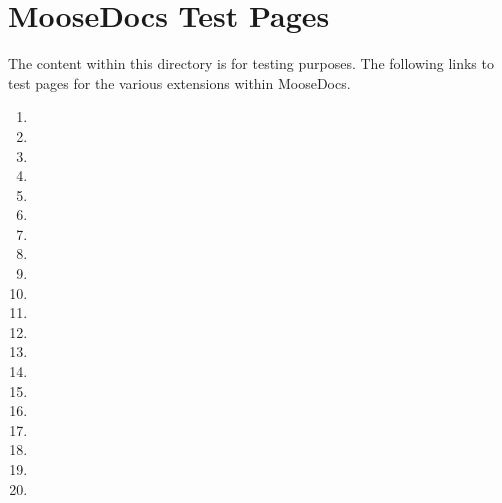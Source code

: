 
\chapter{\label{moosedocs-test-pages}MooseDocs Test Pages}
\par The content within this directory is for testing purposes. The following links to test pages for the various extensions within MooseDocs.
\begin{enumerate}
\item
\par  \item
\par  \item
\par  \item
\par  \item
\par  \item
\par  \item
\par  \item
\par  \item
\par  \item
\par  \item
\par  \item
\par  \item
\par  \item
\par  \item
\par  \item
\par  \item
\par  \item
\par  \item
\par  \item
\par 
\end{enumerate}